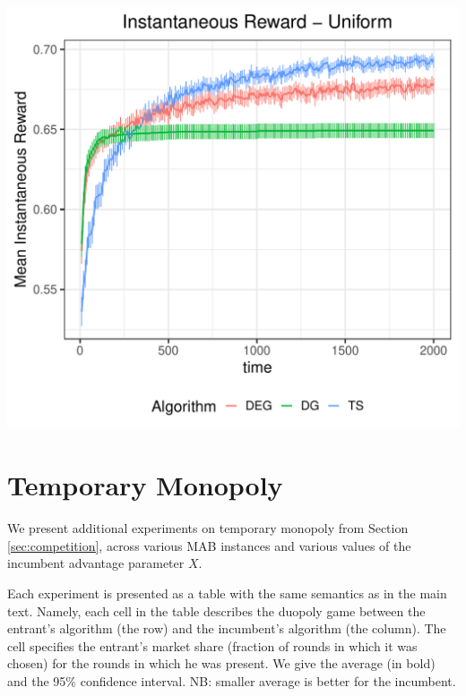 \documentclass[../competing_bandits_with_appendix.tex]{subfiles}
\begin{document}
\begin{center}
\includegraphics[scale=0.35]{ec19paper/appendix_figures/mean_inst_reward_uniform}
\end{center}

\section{Temporary Monopoly}

We present additional experiments on temporary monopoly from Section \ref{sec:competition}, across various MAB instances and various values of the incumbent advantage parameter $X$.

Each experiment is presented as a table with the same semantics as in the main text. Namely, each cell in the table describes the duopoly game between the entrant's algorithm (the row) and the incumbent's algorithm (the column). The cell specifies the entrant's market share (fraction of rounds in which it was chosen) for the rounds in which he was present. We give the average (in bold) and the 95\% confidence interval. NB: smaller average is better for the incumbent.

\end{document}
